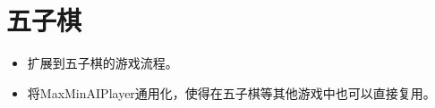 \documentclass[export, 12pt, letterpaper]{ctexrep}
\begin{document}
\section{五子棋}


\begin{itemize}
\item{ 扩展到五子棋的游戏流程。 }
\item{ 将MaxMinAIPlayer通用化，使得在五子棋等其他游戏中也可以直接复用。 }
\end{itemize}
\end{document}
